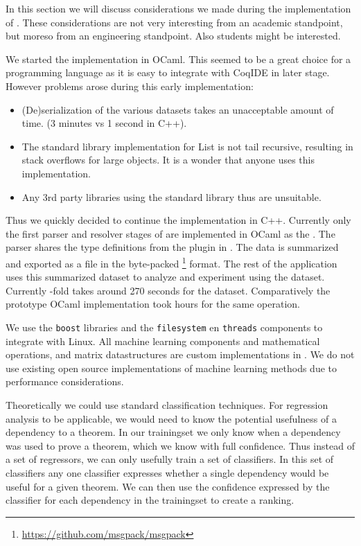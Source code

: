 \label{section:implementation}

In this section we will discuss considerations we made during the implementation of \roerei.
These considerations are not very interesting from an academic standpoint, but moreso from an engineering standpoint.
Also students might be interested.

We started the \roerei implementation in OCaml.
This seemed to be a great choice for a programming language as it is easy to integrate with CoqIDE in later stage.
However problems arose during this early implementation:
\begin{itemize}
\item (De)serialization of the various datasets takes an unacceptable amount of time. (3 minutes vs 1 second in C++).
\item The standard library implementation for List is not tail recursive, resulting in stack overflows for large objects.
    It is a wonder that anyone uses this implementation.
\item Any 3rd party libraries using the standard library thus are unsuitable.
\end{itemize}

Thus we quickly decided to continue the implementation in C++.
Currently only the first parser and resolver stages of \roerei are implemented in OCaml as the \preloader.
The parser shares the \acic type definitions from the \xml plugin in .
The data is summarized and exported as a file in the byte-packed \msgpack\footnote{\url{https://github.com/msgpack/msgpack}} format.
The rest of the \roerei application uses this summarized dataset to analyze and experiment using the dataset.
Currently -fold \crossvalidation takes around 270 seconds for the \coq dataset.
Comparatively the prototype OCaml implementation took hours for the same operation.

We use the \texttt{boost} libraries and the \texttt{filesystem} en \texttt{threads} components to integrate with Linux.
All machine learning components and mathematical operations, and matrix datastructures are custom implementations in \roerei.
We do not use existing open source implementations of machine learning methods due to performance considerations.

Theoretically we could use standard classification techniques.
For regression analysis to be applicable, we would need to know the potential usefulness of a dependency to a theorem.
In our trainingset we only know when a dependency was used to prove a theorem, which we know with full confidence.
Thus instead of a set of regressors, we can only usefully train a set of classifiers.
In this set of classifiers any one classifier expresses whether a single dependency would be useful for a given theorem.
We can then use the confidence expressed by the classifier for each dependency in the trainingset to create a ranking.

